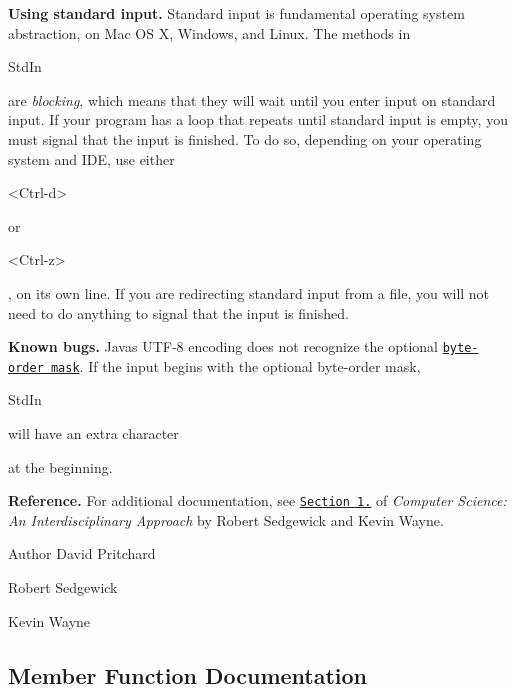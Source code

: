{\bfseries Using standard input.} Standard input is fundamental operating system abstraction, on Mac OS X, Windows, and Linux. The methods in
\begin{DoxyCode}
StdIn 
\end{DoxyCode}
 are {\itshape blocking}, which means that they will wait until you enter input on standard input. If your program has a loop that repeats until standard input is empty, you must signal that the input is finished. To do so, depending on your operating system and I\+DE, use either
\begin{DoxyCode}
<Ctrl-d> 
\end{DoxyCode}
 or
\begin{DoxyCode}
<Ctrl-z> 
\end{DoxyCode}
 , on its own line. If you are redirecting standard input from a file, you will not need to do anything to signal that the input is finished. 

{\bfseries Known bugs.} Java\textquotesingle{}s U\+T\+F-\/8 encoding does not recognize the optional \href{http://bugs.sun.com/bugdatabase/view_bug.do?bug_id=4508058}{\tt byte-\/order mask}. If the input begins with the optional byte-\/order mask,
\begin{DoxyCode}
StdIn 
\end{DoxyCode}
 will have an extra character
 at the beginning. 

{\bfseries Reference.} For additional documentation, see \href{http://introcs.cs.princeton.edu/15inout}{\tt Section 1.} of {\itshape Computer Science\+: An Interdisciplinary Approach} by Robert Sedgewick and Kevin Wayne.

\begin{DoxyAuthor}{Author}
David Pritchard 

Robert Sedgewick 

Kevin Wayne 
\end{DoxyAuthor}


\subsection{Member Function Documentation}
\mbox{\label{classcom_1_1mycompany_1_1myfirstmapboxapp_1_1_std_in_ab46430a80e71ad8adc86ac0c068c20be}} 
